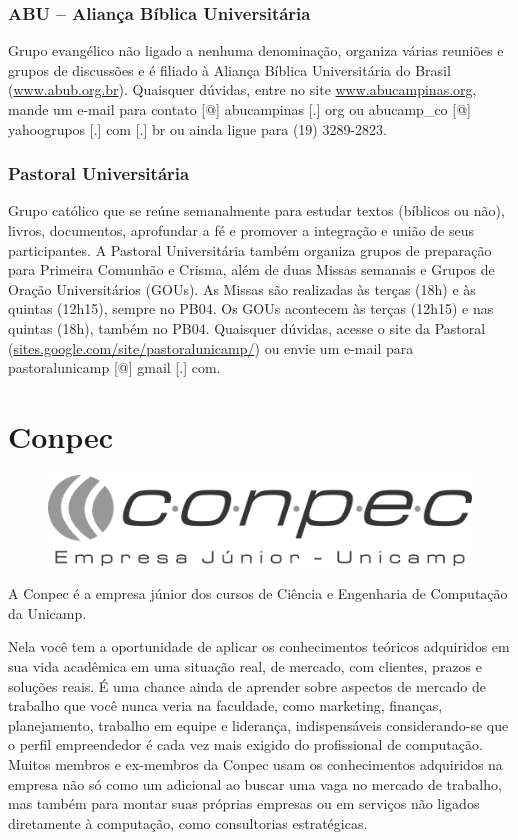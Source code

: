 \subsubsection{ABU -- Aliança Bíblica Universitária}

Grupo evangélico não ligado a nenhuma denominação, organiza várias reuniões
e grupos de discussões e é filiado à Aliança Bíblica Universitária do Brasil
(\url{www.abub.org.br}). Quaisquer dúvidas, entre no site
\url{www.abucampinas.org}, mande um e-mail para contato [@] abucampinas
[.] org ou abucamp\_co [@] yahoogrupos [.] com [.] br ou ainda ligue para (19)
3289-2823.

\subsubsection{Pastoral Universitária}

Grupo católico que se reúne semanalmente para estudar textos (bíblicos ou não),
livros, documentos, aprofundar a fé e promover a integração e união de seus
participantes. A Pastoral Universitária também organiza grupos de preparação
para Primeira Comunhão e Crisma, além de duas Missas semanais e Grupos de Oração
Universitários (GOUs). As Missas são realizadas às terças (18h) e às
quintas (12h15), sempre no PB04. Os GOUs acontecem às terças (12h15) e
nas quintas (18h), também no PB04. Quaisquer dúvidas, acesse o site da
Pastoral (\url{sites.google.com/site/pastoralunicamp/}) ou
envie um e-mail para pastoralunicamp [@] gmail [.] com.

\newpage
\section{Conpec}

\begin{figure}[H]
    \centering
    \includegraphics[scale=0.40]{img/conpec.png}
\end{figure}

A Conpec é a empresa júnior dos cursos de Ciência e Engenharia de Computação da
Unicamp.

Nela você tem a oportunidade de aplicar os conhecimentos teóricos
adquiridos em sua vida acadêmica em uma situação real, de mercado, com clientes,
prazos e soluções reais. É uma chance ainda de aprender sobre aspectos de mercado de trabalho que você
nunca veria na faculdade, como marketing, finanças, planejamento, trabalho em equipe e liderança,
indispensáveis considerando-se que o perfil empreendedor é cada vez mais exigido do profissional de
computação. Muitos membros e ex-membros da Conpec usam os
conhecimentos adquiridos na empresa não só como um adicional ao buscar uma vaga
no mercado de trabalho, mas também para montar suas próprias empresas ou em
serviços não ligados diretamente à computação, como consultorias estratégicas.


